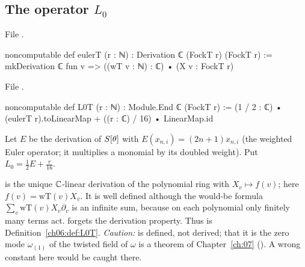 \subsection{The operator \texorpdfstring{$L_0$}{L0}}

\noindent File .
\begin{leancode}
noncomputable def eulerT (r : ℕ) : Derivation ℂ (FockT r) (FockT r) :=
  mkDerivation ℂ fun v => ((wT v : ℕ) : ℂ) • (X v : FockT r)
\end{leancode}
\noindent File .
\begin{leancode}
noncomputable def L0T (r : ℕ) : Module.End ℂ (FockT r) :=
  (1 / 2 : ℂ) • (eulerT r).toLinearMap + ((r : ℂ) / 16) • LinearMap.id
\end{leancode}
\begin{definition}\label{ch06:def:L0T}
Let $E$ be the derivation of $S[\theta]$ with $E(x_{n,i})=(2n+1)x_{n,i}$ (the weighted Euler
operator; it multiplies a monomial by its doubled weight).  Put $L_0=\frac12E+\frac r{16}$.
\end{definition}
\begin{dictionary}
 is the unique ${\mathbb{C}}$-linear derivation of the polynomial ring with
$X_v\mapsto f(v)$; here $f(v)=\mathrm{wT}(v)X_v$.  It is well defined although the would-be formula
$\sum_v\mathrm{wT}(v)X_v\partial_v$ is an infinite sum, because on each polynomial only finitely many
terms act.   forgets the derivation property.  Thus  is
Definition~\ref{ch06:def:L0T}.  \emph{Caution:}  is defined, not derived; that it is the
zero mode $\omega_{(1)}$ of the twisted field of $\omega$ is a theorem of Chapter~\ref{ch:07}
().  A wrong constant here would be caught there.
\end{dictionary}

